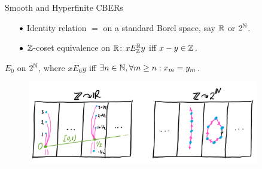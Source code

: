 \documentclass{beamer}
\begin{document}
    \begin{frame}{Smooth and Hyperfinite CBERs}
        \vspace{-0.34in}
        \begin{example}[Smooth]
            \begin{itemize}
                \item[\scriptsize$\bullet$] Identity relation $=$ on a standard Borel space, say $\mathbb{R}$ or $2^{\mathbb{N}}$.
                \item[\scriptsize$\bullet$] $\mathbb{Z}$-coset equivalence on $\mathbb{R}$: $xE^{\mathbb{R}}_{\mathbb{Z}} y$ iff $x-y\in\mathbb{Z}$.
            \end{itemize}
        \end{example}

        \vspace{-0.1in}

        \begin{example}[Hyperfinite]
            $E_0$ on $2^{\mathbb{N}}$, where $xE_0y$ iff $\exists n\in\mathbb{N},\forall m\geq n:x_m=y_m$.
        \end{example}

        \vspace{-0.15in}

        \begin{figure}[h]
            \center
            \includegraphics[width=0.9\textwidth]{img/smooth_hyperfinite.png}
        \end{figure}
    \end{frame}
\end{document}
